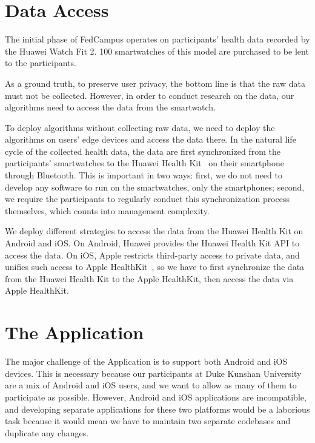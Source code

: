 \section{Data Access}

The initial phase of FedCampus operates on participants' health data recorded by
the Huawei Watch Fit 2.
100 smartwatches of this model are purchased to be lent to the participants.

As a ground truth, to preserve user privacy,
the bottom line is that the raw data must not be collected.
However, in order to conduct research on the data,
our algorithms need to access the data from the smartwatch.

To deploy algorithms without collecting raw data,
we need to deploy the algorithms on users' edge devices and
access the data there.
In the natural life cycle of the collected health data,
the data are first synchronized from the participants' smartwatches to
the Huawei Health Kit~\cite{huaweihealthkit} on
their smartphone through Bluetooth.
This is important in two ways:
first, we do not need to develop any software to run on the smartwatches,
only the smartphones; second,
we require the participants to regularly conduct this synchronization process
themselves, which counts into management complexity.

We deploy different strategies to access the data from the Huawei Health Kit on
Android and iOS.
On Android, Huawei provides the Huawei Health Kit API to access the data.
On iOS, Apple restricts third-party access to private data,
and unifies such access to Apple HealthKit~\cite{applehealthkit},
so we have to first synchronize the data from the Huawei Health Kit to
the Apple HealthKit, then access the data via Apple HealthKit.

\section{The \fedcampus Application}

The major challenge of the \fedcampus Application is to
support both Android and iOS devices.
This is necessary because our participants at Duke Kunshan University are
a mix of Android and iOS users,
and we want to allow as many of them to participate as possible.
However, Android and iOS applications are incompatible,
and developing separate applications for these two platforms would be
a laborious task because
it would mean we have to maintain two separate codebases and
duplicate any changes.

